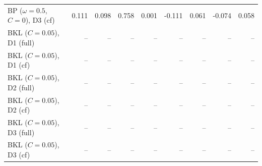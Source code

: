 \begin{tabular}{lrrrrrrrr}
BP ($\omega=0.5$, $C=0$), D3 (cf) & 0.111 & 0.098 & 0.758 & 0.001 & -0.111 & 0.061 & -0.074 & 0.058 \\
BKL ($C=0.05$), D1 (full) & -- & -- & -- & -- & -- & -- & -- & -- \\
BKL ($C=0.05$), D1 (cf) & -- & -- & -- & -- & -- & -- & -- & -- \\
BKL ($C=0.05$), D2 (full) & -- & -- & -- & -- & -- & -- & -- & -- \\
BKL ($C=0.05$), D2 (cf) & -- & -- & -- & -- & -- & -- & -- & -- \\
BKL ($C=0.05$), D3 (full) & -- & -- & -- & -- & -- & -- & -- & -- \\
BKL ($C=0.05$), D3 (cf) & -- & -- & -- & -- & -- & -- & -- & -- \\
\hline
\end{tabular}
